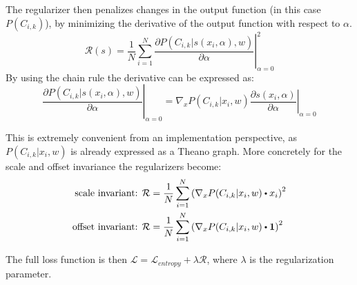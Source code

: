 The regularizer then penalizes changes in the output function (in this case $P(C_{i, k})$), by minimizing the derivative of the output function with respect to $\alpha$.
\begin{equation}
\mathcal{R}(s) = \frac{1}{N} \sum_{i=1}^N \left. \frac{\partial P(C_{i, k} | s(x_i, \alpha), w)}{\partial \alpha} \right|^2_{\alpha=0}
\end{equation}
By using the chain rule the derivative can be expressed as:
\begin{equation*}
\left. \frac{\partial P(C_{i, k} | s(x_i, \alpha), w)}{\partial \alpha} \right|_{\alpha=0} = \left.\nabla_x P(C_{i, k} |  x_i, w) \frac{\partial s(x_i, \alpha)}{\partial \alpha} \right|_{\alpha=0}
\end{equation*}

This is extremely convenient from an implementation perspective, as $P(C_{i, k} | x_i, w)$ is already expressed as a Theano graph. More concretely for the scale and offset invariance the regularizers become:
\begin{align}
\text{scale invariant: }& \mathcal{R} = \frac{1}{N} \sum_{i=1}^N \left(\nabla_x P(C_{i, k} | x_i, w) \bigcdot x_i\right)^2 \\
\text{offset invariant: }& \mathcal{R} = \frac{1}{N} \sum_{i=1}^N \left(\nabla_x P(C_{i, k} | x_i, w) \bigcdot \mathbf{1}\right)^2
\end{align}

The full loss function is then $\mathcal{L} = \mathcal{L}_{entropy} + \lambda \mathcal{R}$, where $\lambda$ is the regularization parameter.
